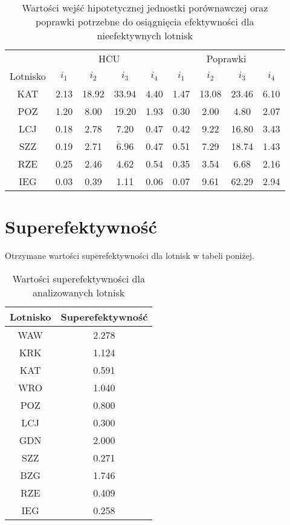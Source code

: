 \documentclass[a4paper,12pt]{article}
\begin{document}
\begin{table}[H]
    \centering
    \begin{tabular}{c|cccc|cccc}
    \hline
        & \multicolumn{4}{c|}{HCU} & \multicolumn{4}{c}{Poprawki}  \\
         Lotnisko & $i_1$ & $i_2$ & $i_3$ & $i_4$ & $i_1$ & $i_2$ & $i_3$ & $i_4$ \\ \hline
         KAT & 2.13 & 18.92 & 33.94 & 4.40 & 1.47 & 13.08 & 23.46 & 6.10 \\
POZ & 1.20 & 8.00 & 19.20 & 1.93 & 0.30 & 2.00 & 4.80 & 2.07 \\
LCJ & 0.18 & 2.78 & 7.20 & 0.47 & 0.42 & 9.22 & 16.80 & 3.43 \\
SZZ & 0.19 & 2.71 & 6.96 & 0.47 & 0.51 & 7.29 & 18.74 & 1.43 \\
RZE & 0.25 & 2.46 & 4.62 & 0.54 & 0.35 & 3.54 & 6.68 & 2.16 \\
IEG & 0.03 & 0.39 & 1.11 & 0.06 & 0.07 & 9.61 & 62.29 & 2.94 \\
    \end{tabular}
    \caption{Wartości wejść hipotetycznej jednostki porównawczej oraz poprawki potrzebne do osiągnięcia efektywności dla nieefektywnych lotnisk }
    \label{tab:airports-hcu-and-improvements}
\end{table}

\section{Superefektywność}

Otrzymane wartości superefektywności dla lotnisk w tabeli poniżej.

\begin{table}[H]
    \centering
    \begin{tabular}{c|c}
    \hline
         Lotnisko & Superefektywność  \\ \hline
         WAW & 2.278 \\
KRK & 1.124 \\
KAT & 0.591 \\
WRO & 1.040 \\
POZ & 0.800 \\
LCJ & 0.300 \\
GDN & 2.000 \\
SZZ & 0.271 \\
BZG & 1.746 \\
RZE & 0.409 \\
IEG & 0.258 \\
         \hline
    \end{tabular}
    \caption{Wartości superefektywności dla analizowanych lotnisk}
    \label{tab:airports-super-efficiency}
\end{table}
\end{document}
